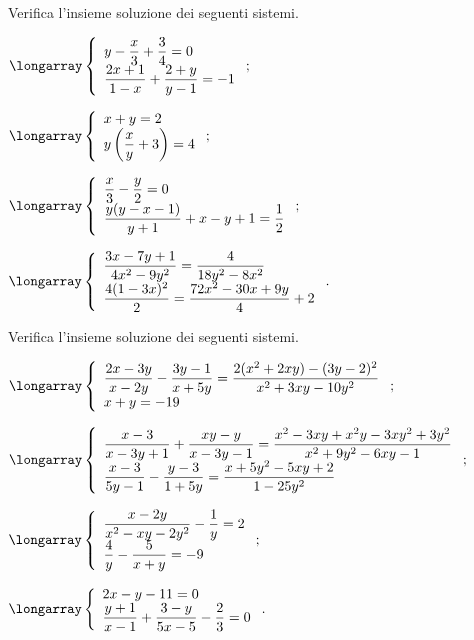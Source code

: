 \begin{esercizio}[\Ast]
 \label{ese:19.49}
Verifica l'insieme soluzione dei seguenti sistemi.
\begin{multicols}{2}
\begin{enumeratea}
\item $\longarray\left\{\begin{array}{l}y-\dfrac{x}{3}+\dfrac{3}{4}=0\\\dfrac{2x+1}{1-x}+\dfrac{2+y}{y-1}=-1\end{array}\right.;$
\item $\longarray\left\{\begin{array}{l}x+y=2\\y\left(\dfrac{x}{y}+3\right)=4\end{array}\right.;$
\item $\longarray\left\{\begin{array}{l}\dfrac{x}{3}-\dfrac{y}{2}=0\\\dfrac{y(y-x-1)}{y+1}+x-y+1=\dfrac{1}{2}\end{array}\right.;$
\item $\longarray\left\{\begin{array}{l}\dfrac{3x-7y+1}{4x^{2}-9y^{2}}=\dfrac{4}{18y^{2}-8x^{2}}\\\dfrac{4(1-3x)^{2}}{2}=\dfrac{72x^{2}-30x+9y}{4}+2\end{array}\right..$
\end{enumeratea}
\end{multicols}
\end{esercizio}

\begin{esercizio}[\Ast]
 \label{ese:19.50}
Verifica l'insieme soluzione dei seguenti sistemi.

\begin{enumeratea}
\item $\longarray\left\{\begin{array}{l}\dfrac{2x-3y}{x-2y}-\dfrac{3y-1}{x+5y}=\dfrac{2(x^{2}+2xy)-(3y-2)^{2}}{x^{2}+3xy-10y^{2}}\\x+y=-19\end{array}\right.;$
\item $\longarray\left\{\begin{array}{l}\dfrac{x-3}{x-3y+1}+\dfrac{xy-y}{x-3y-1}=\dfrac{x^{2}-3xy+x^{2}y-3xy^{2}+3y^{2}}{x^{2}+9y^{2}-6xy-1}\\\dfrac{x-3}{5y-1}-\dfrac{y-3}{1+5y}=\dfrac{x+5y^{2}-5xy+2}{1-25y^{2}}\end{array}\right.;$
\item $\longarray\left\{\begin{array}{l}\dfrac{x-2y}{x^{2}-xy-2y^{2}}-\dfrac{1}{y}=2\\\dfrac{4}{y}-\dfrac{5}{x+y}=-9\end{array}\right.;$
\item $\longarray\left\{\begin{array}{l}{2x-y-11=0}\\{\dfrac{y+1}{x-1}+\dfrac{3-y}{5x-5}-\dfrac{2}{3}=0}\end{array}\right..$
\end{enumeratea}
\end{esercizio}

